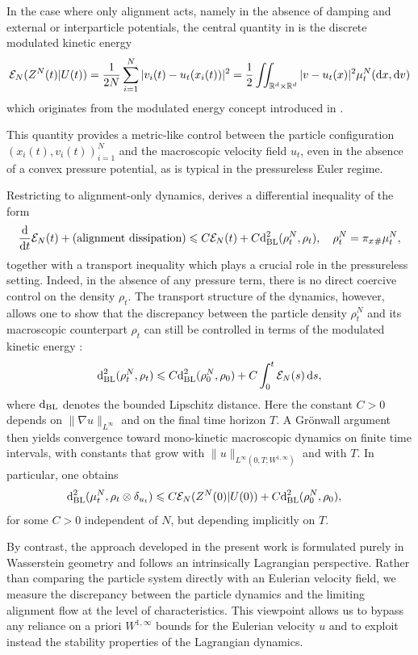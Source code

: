 \documentclass[10pt,reqno]{amsart}
\renewcommand{\leq}{\leqslant}
\numberwithin{equation}{section}
\newcommand{\R}{\mathbb R}
\newcommand{\intrr}{\iint_{\R^d \times \R^d}}
\newcommand{\calE}{\mathcal E}
\newcommand{\rd}{\textnormal{d}}
\newcommand{\dx}{\textnormal{d}x}
\newcommand{\dt}{\textnormal{d}t}
\newcommand{\dv}{\textnormal{d}v}
\newcommand{\ds}{\textnormal{d}s}
\begin{document}
In the case where only alignment acts, namely in the absence of damping and external or interparticle potentials, the central quantity in \cite{CC21} is the discrete modulated kinetic energy
\[
\calE_N(Z^N(t) | U(t)) = \frac1{2N}\sum_{i=1}^N |v_i(t) - u_t(x_i(t))|^2 = \frac12 \intrr |v - u_t(x)|^2 \mu^N_t(\dx,\dv)
\]
which originates from the modulated energy concept introduced in \cite{Bre00, BMNP03, Mas01, Ser20}.

This quantity provides a metric-like control between the particle configuration $(x_i(t),v_i(t))_{i=1}^N$ and the macroscopic velocity field $u_t$, even in the absence of a convex pressure potential, as is typical in the pressureless Euler regime.

Restricting to alignment-only dynamics, \cite{CC21} derives a differential inequality of the form
\[
\frac{\rd}{\dt}\calE_N(t) + (\mbox{alignment dissipation}) \leq C \calE_N(t) + C{\rd}_{\rm BL}^2(\rho^N_t, \rho_t), \quad \rho^N_t = \pi_x {}_\# \mu^N_t,
\]
together with a transport inequality which plays a crucial role in the pressureless setting. Indeed, in the absence of any pressure term, there is no direct coercive control on the density $\rho_t$.
The transport structure of the dynamics, however, allows one to show that the discrepancy between the particle density $\rho_t^N$ and its macroscopic counterpart $\rho_t$ can still be controlled in terms of the modulated kinetic energy \cite{Cho21}:
\[
{\rd}^2_{\rm BL}(\rho^N_t, \rho_t) \leq C {\rd}_{\rm BL}^2(\rho^N_0, \rho_0) + C \int_0^t \calE_N(s)\,\ds,
\]
where ${\rd}_{\rm BL}$ denotes the bounded Lipschitz distance. Here the constant $C>0$ depends on $\|\nabla u\|_{L^\infty}$ and on the final time horizon $T$. A Gr\"onwall argument then yields convergence toward mono-kinetic macroscopic dynamics on finite time intervals, with constants that grow with
$\|u\|_{L^\infty(0,T;W^{1,\infty})}$ and with $T$.
In particular, one obtains
\begin{align*}
{\rd}_{\rm BL}^2(\mu^N_t, \rho_t \otimes \delta_{u_t}) %
&\leq C\calE_N(Z^N(0) | U(0)) + C {\rd}^2_{\rm BL}(\rho^N_0, \rho_0),
\end{align*}
for some $C>0$ independent of $N$, but depending implicitly on $T$. 

By contrast, the approach developed in the present work is formulated purely in Wasserstein geometry and follows an intrinsically Lagrangian perspective. Rather than comparing the particle system directly with an Eulerian velocity field, we measure the discrepancy between the particle dynamics and the limiting alignment flow at the level of characteristics. This viewpoint allows us to bypass any reliance on a priori $W^{1,\infty}$ bounds for the Eulerian velocity $u$ and to exploit instead the stability properties of the Lagrangian dynamics.
\end{document}
